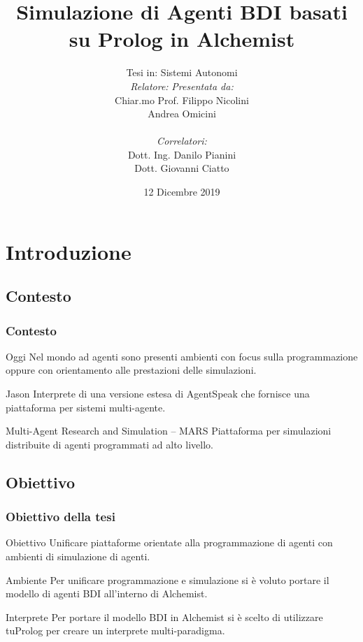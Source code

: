 \documentclass[handout]{beamer}\mode<presentation>{\usetheme{AMSCesenaBleu}}
\title[Agenti BDI basati su Prolog in Alchemist]{Simulazione di Agenti BDI basati su Prolog in Alchemist}
\author[Filippo Nicolini]{Tesi in: Sistemi Autonomi\\
[0.5cm]
\textit{Relatore:} \hspace{6.55cm} \textit{Presentata da:}\\
Chiar.mo Prof. \hspace{5.5cm} Filippo Nicolini\\
Andrea Omicini \hspace{7.6cm} \phantom{g}\\
\textit{\\Correlatori:} \hspace{8.25cm} \phantom{g}\\
Dott. Ing. Danilo Pianini \hspace{6cm} \phantom{g}\\
Dott. Giovanni Ciatto \hspace{6.5cm} \phantom{g}\\
}
\institute[]{
\textsc{Alma Mater Studiorum} -- Università di Bologna \\
Campus di Cesena}
\date{12 Dicembre 2019}
\begin{document}
\maketitle


\section{Introduzione}

\subsection{Contesto}
\begin{frame}
\frametitle{Contesto}
\begin{block}{Oggi}
Nel mondo ad agenti sono presenti ambienti con focus sulla programmazione oppure con orientamento alle prestazioni delle simulazioni.
\end{block}

\begin{block}{Jason}
Interprete di una versione estesa di AgentSpeak che fornisce una piattaforma per sistemi multi-agente.
\end{block}

\begin{block}{Multi-Agent Research and Simulation -- MARS}
Piattaforma per simulazioni distribuite di agenti programmati ad alto livello.
\end{block}
\end{frame}

\subsection{Obiettivo}
\begin{frame}
\frametitle{Obiettivo della tesi}
\begin{block}{Obiettivo}
\alert{Unificare} piattaforme orientate alla \alert{programmazione di agenti} con ambienti di \alert{simulazione di agenti}.
\end{block}

\begin{block}{Ambiente}
Per unificare programmazione e simulazione si è voluto portare il modello di agenti BDI all'interno di Alchemist.
\end{block}

\begin{block}{Interprete}
Per portare il modello BDI in Alchemist si è scelto di utilizzare tuProlog per creare un interprete multi-paradigma.
\end{block}
\end{frame}
\end{document}
